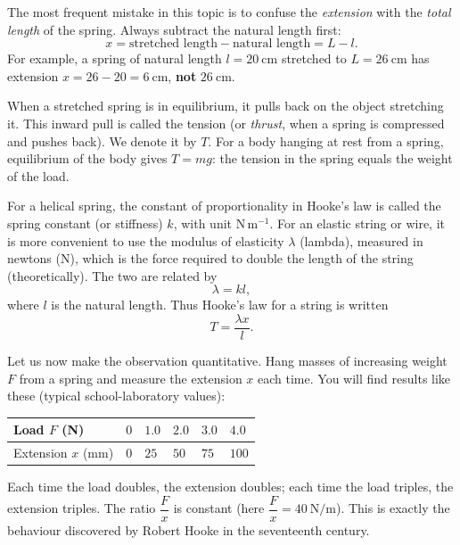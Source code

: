\documentclass[11pt]{article}
\newcommand{\cle}[1]{{\popxbold\color{popdark}#1}}
\newcounter{popsec}
\newcounter{popsub}
\newcommand{\courssub}[1]{%
  \stepcounter{popsub}%
  \par\vspace{9pt}\noindent{\popxbold\fontsize{11.5}{13}\selectfont\color{popink}{\color{poporange}\thepopsec.\thepopsub}\hspace{6pt}#1}\par\nopagebreak\vspace{4pt}
}
\begin{document}
\begin{attention}
The most frequent mistake in this topic is to confuse the \emph{extension} with the \emph{total length} of the spring. Always subtract the natural length first:
\[ x = \text{stretched length} - \text{natural length} = L - l. \]
For example, a spring of natural length $l = 20\ \mathrm{cm}$ stretched to $L = 26\ \mathrm{cm}$ has extension $x = 26 - 20 = 6\ \mathrm{cm}$, \textbf{not} $26\ \mathrm{cm}$.
\end{attention}

When a stretched spring is in equilibrium, it pulls back on the object stretching it. This inward pull is called the \cle{tension} (or \emph{thrust}, when a spring is compressed and pushes back). We denote it by $T$. For a body hanging at rest from a spring, equilibrium of the body gives $T = mg$: the tension in the spring equals the weight of the load.

\begin{definition}
For a helical spring, the constant of proportionality in Hooke's law is called the \cle{spring constant} (or stiffness) $k$, with unit $\mathrm{N\,m^{-1}}$.
For an elastic string or wire, it is more convenient to use the \cle{modulus of elasticity} $\lambda$ (lambda), measured in newtons (N), which is the force required to double the length of the string (theoretically). The two are related by
\[ \lambda = k l, \]
where $l$ is the natural length. Thus Hooke's law for a string is written
\[ T = \frac{\lambda x}{l}. \]
\end{definition}

\courssub{Statement of Hooke's Law}

Let us now make the observation quantitative. Hang masses of increasing weight $F$ from a spring and measure the extension $x$ each time. You will find results like these (typical school-laboratory values):

\begin{center}
\begin{tabularx}{\linewidth}{|l|X|X|X|X|X|}
\hline
\rowcolor{popblueL} Load $F$ (N) & $0$ & $1.0$ & $2.0$ & $3.0$ & $4.0$ \\
\hline Extension $x$ (mm) & $0$ & $25$ & $50$ & $75$ & $100$ \\
\hline
\end{tabularx}
\end{center}

Each time the load doubles, the extension doubles; each time the load triples, the extension triples. The ratio $\dfrac{F}{x}$ is constant (here $\dfrac{F}{x} = 40\ \mathrm{N/m}$). This is exactly the behaviour discovered by Robert Hooke in the seventeenth century.
\end{document}
